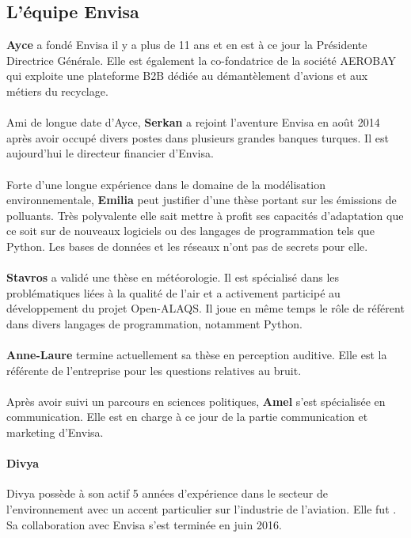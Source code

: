 \documentclass[a4paper,12pt,twoside]{article}
\begin{document}
    \subsection*{L'équipe Envisa}
    \textbf{Ayce} a fondé Envisa il y a plus de 11 ans et en est à ce jour la Présidente Directrice Générale. Elle est également la co-fondatrice de la société AEROBAY qui exploite une plateforme \gls{B2B} dédiée au démantèlement d'avions et aux métiers du recyclage.
    \\\\
    Ami de longue date d'Ayce, \textbf{Serkan} a rejoint l'aventure Envisa en août 2014 après avoir occupé divers postes dans plusieurs grandes banques turques. Il est aujourd'hui le directeur financier d'Envisa.
    \\\\
    Forte d'une longue expérience dans le domaine de la modélisation environnementale, \textbf{Emilia} peut justifier d'une thèse portant sur les émissions de polluants. Très polyvalente elle sait mettre à profit ses capacités d'adaptation que ce soit sur de nouveaux logiciels ou des langages de programmation tels que Python. Les bases de données et les réseaux n'ont pas de secrets pour elle.
    \\\\
    \textbf{Stavros} a validé une thèse en météorologie. Il est spécialisé dans les problématiques liées à la qualité de l'air et a activement participé au développement du projet \gls{Open-ALAQS}. Il joue en même temps le rôle de référent dans divers langages de programmation, notamment Python.
    \\\\
	\textbf{Anne-Laure} termine actuellement sa thèse en perception auditive. Elle est la référente de l'entreprise pour les questions relatives au bruit.
    \\\\
    Après avoir suivi un parcours en sciences politiques, \textbf{Amel} s'est spécialisée en communication. Elle est en charge à ce jour de la partie communication et marketing d'Envisa.
    \paragraph{Divya}
    Divya possède à son actif 5 années d'expérience dans le secteur de l'environnement avec un accent particulier sur l'industrie de l'aviation. Elle fut . Sa collaboration avec Envisa s'est terminée en juin 2016.
    \newpage
    
\end{document}
